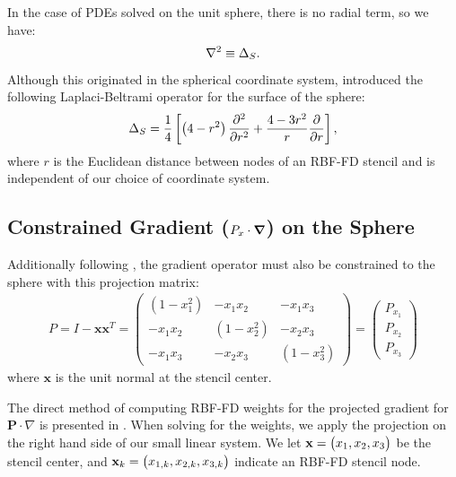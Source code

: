 \documentclass[11pt]{report}
\begin{document}
{In the case of PDEs solved on the unit sphere, there is no radial term, so we have:
\begin{align}
\nabla^2 \equiv \Delta_S .
\end{align}
Although this originated in the spherical coordinate system, \cite{WrightFlyerYuen10} introduced the following Laplaci-Beltrami operator for the surface of the sphere: 
\begin{align} 
\Delta_S = \frac{1}{4} \left[ \left(4-r^2\right) \frac{\partial^2 }{\partial r^2} + \frac{4-3r^2}{r} \frac{\partial }{\partial r} \right],
\end{align} 
where $r$ is the Euclidean distance between nodes of an RBF-FD stencil and is independent of our choice of coordinate system. 

\subsection{Constrained Gradient ($P_{x} \cdot \grad$) on the Sphere}

Additionally following \cite{FlyerWright09, FlyerLehto11}, the gradient operator must also be constrained to the sphere with this projection matrix: 
\begin{align}
P = I - \mathbf{x} \mathbf{x}^T =  \begin{pmatrix} 
(1-x_1^2) & -x_1 x_2 & -x_1 x_3 \\
-x_1 x_2 & (1-x_2^2) & -x_2 x_3 \\ 
-x_1 x_3 & -x_2 x_3 & (1-x_3^2) 
\end{pmatrix} = \begin{pmatrix} P_{x_1} \\ P_{x_2} \\ P_{x_3} \end{pmatrix}
\label{eq:project_gradient}
\end{align}
where $\mathbf{x}$ is the unit normal at the stencil center. 


The direct method of computing RBF-FD weights for the projected gradient for $\mathbf{P} \cdot \nabla $ is presented in \cite{FlyerWright09}. When solving for the weights, we apply the projection on the right hand side of our small linear system. We let $\mathbf{x} = \begin{pmatrix} x_1, x_2, x_3 \end{pmatrix} $ be the stencil center, and $\mathbf{x}_k=\begin{pmatrix} x_{1,k}, x_{2,k}, x_{3,k}\end{pmatrix}$ indicate an RBF-FD stencil node. 

}
\end{document}
